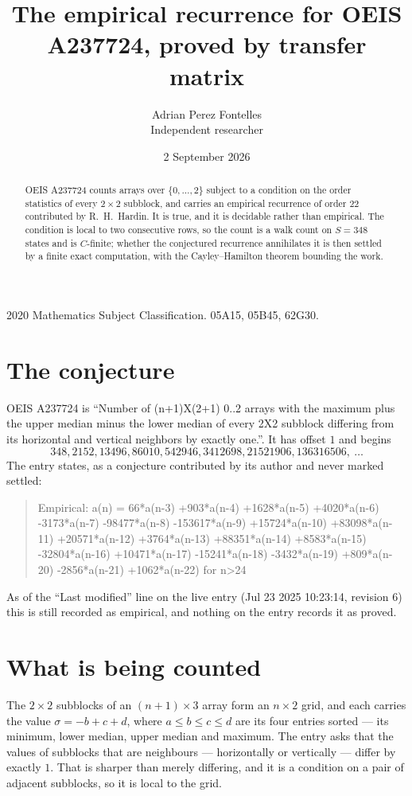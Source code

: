 \documentclass[11pt,a4paper]{article}
\title{The empirical recurrence for OEIS A237724, proved by transfer matrix}
\author{Adrian Perez Fontelles\\ \small Independent researcher}
\date{2 September 2026}
\theoremstyle{plain}
\theoremstyle{definition}
\begin{document}
\maketitle

\begin{abstract}
OEIS A237724 counts arrays over $\{0,\dots,2\}$ subject to a condition on the order
statistics of every $2\times2$ subblock, and carries an empirical recurrence of order
$22$ contributed by R.~H.~Hardin. It is true, and it is decidable rather than empirical.
The condition is local to two consecutive rows, so the count is a walk count on $S=348$
states and is $C$-finite; whether the conjectured recurrence annihilates it is then settled by
a finite exact computation, with the Cayley--Hamilton theorem bounding the work.
\end{abstract}

\noindent\small 2020 Mathematics Subject Classification. 05A15, 05B45, 62G30.\normalsize

\section{The conjecture}

OEIS A237724 is ``Number of (n+1)X(2+1) 0..2 arrays with the maximum plus the upper median minus the lower median of every 2X2 subblock differing from its horizontal and vertical neighbors by exactly one.''. It has offset $1$ and begins
\[
348, 2152, 13496, 86010, 542946, 3412698, 21521906, 136316506,\ \dots
\]
The entry states, as a conjecture contributed by its author and never marked settled:
\begin{quote}
Empirical: a(n) = 66*a(n-3) +903*a(n-4) +1628*a(n-5) +4020*a(n-6) -3173*a(n-7) -98477*a(n-8) -153617*a(n-9) +15724*a(n-10) +83098*a(n-11) +20571*a(n-12) +3764*a(n-13) +88351*a(n-14) +8583*a(n-15) -32804*a(n-16) +10471*a(n-17) -15241*a(n-18) -3432*a(n-19) +809*a(n-20) -2856*a(n-21) +1062*a(n-22) for n>24
\end{quote}
As of the ``Last modified'' line on the live entry (Jul 23 2025 10:23:14, revision 6) this is still
recorded as empirical, and nothing on the entry records it as proved.

\section{What is being counted}

The $2\times2$ subblocks of an $(n+1)\times3$ array form an
$n\times2$ grid, and each carries the value $\sigma=-b+c+d$, where $a\le b\le c\le d$ are its four entries sorted --- its minimum, lower median, upper median and maximum. The entry asks that the values of
subblocks that are neighbours --- horizontally or vertically --- differ by exactly $1$.
That is sharper than merely differing, and it is a condition on a pair of adjacent subblocks,
so it is local to the grid.
\end{document}
